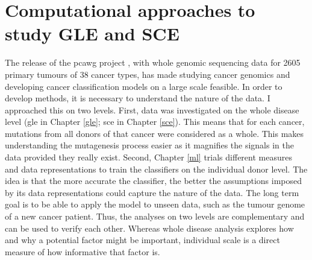


\section{Computational approaches to study GLE and SCE}
\label{intro:ml}

The release of the \gls{pcawg} project \citep{Campbell2020}, with whole genomic sequencing data for 2605 primary tumours of 38 cancer types, has made studying cancer genomics and developing cancer classification models on a large scale feasible. In order to develop methods, it is necessary to understand the nature of the data. I approached this on two levels. First, data was investigated on the whole disease level (\gls{gle} in Chapter \ref{gle}; \gls{sce} in Chapter \ref{sce}). This means that for each cancer, mutations from all donors of that cancer were considered as a whole. This makes understanding the mutagenesis process easier as it magnifies the signals in the data provided they really exist. Second, Chapter \ref{ml} trials different measures and data representations to train the classifiers on the individual donor level. The idea is that the more accurate the classifier, the better the assumptions imposed by its data representations could capture the nature of the data. The long term goal is to be able to apply the model to unseen data, such as the tumour genome of a new cancer patient. Thus, the analyses on two levels are complementary and can be used to verify each other. Whereas whole disease analysis explores how and why a potential factor might be important, individual scale is a direct measure of how informative that factor is.  

